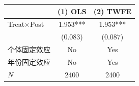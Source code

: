 \begin{tabular}{lcc}
\hline\hline
 & (1) OLS & (2) TWFE \\
\hline
Treat$\times$Post & 1.953*** & 1.953*** \\
 & (0.083) & (0.087) \\
个体固定效应 & No & Yes \\
年份固定效应 & No & Yes \\
$N$ & 2400 & 2400 \\
\hline\hline
\end{tabular}